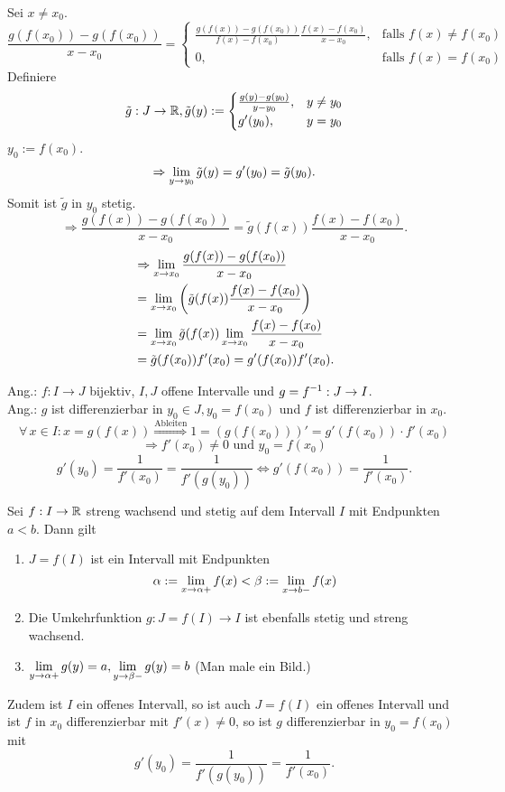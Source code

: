 \documentclass[../ana1.tex]{subfiles}
\begin{document}
\begin{bew}
    Sei \( x \neq x_0 \).
    \[ \frac{ g(f(x_0)) - g(f(x_0)) }{ x - x_0 } = \begin{cases}
        \frac{ g(f(x)) - g(f(x_0)) }{f(x) - f(x_0)} 
        \frac{ f(x) - f(x_0) }{ x-x_0 }, &\text{falls } f(x) \neq f(x_0)\\
        0, &\text{falls } f(x) = f(x_0)
    \end{cases} \]
    Definiere \[ \tilde{g} : J \rightarrow \mathbb{R}, \tilde{g}(y) := \begin{cases}
        \frac{ g(y) - g(y_0) }{ y - y_0 }, &y \neq y_0\\
        g'(y_0), &y=y_0
    \end{cases} \]
    \( y_0 := f(x_0) \).
    \[ \Rightarrow \lim\limits_{y\rightarrow y_0} \tilde{g}(y) = g'(y_0) = \tilde{g}(y_0). \]
    Somit ist \( \tilde{g} \) in \(y_0\) stetig.
    \[ \Rightarrow \frac{ g(f(x)) - g(f(x_0)) }{ x - x_0 } 
    = \tilde{g}(f(x)) \frac{ f(x) - f(x_0) }{x - x_0}. \]
    \begin{align*}
        &\Rightarrow \lim\limits_{x\rightarrow x_0} \frac{ g(f(x)) - g(f(x_0)) }{ x - x_0 } \\
        &= \lim\limits_{x\rightarrow x_0} \left( \tilde{g}(f(x)) \frac{f(x) - f(x_0)}{x - x_0} \right) \\
        &= \lim\limits_{x\rightarrow x_0} \tilde{g}(f(x)) \lim\limits_{x\rightarrow x_0} \frac{f(x) - f(x_0)}{x - x_0} \\
        &= \tilde{g}(f(x_0))f'(x_0) = g'(f(x_0)) f'(x_0).
    \end{align*}
\end{bew}
Ang.: \( f : I \rightarrow J\) bijektiv, \( I, J \) offene Intervalle und 
\( g = \inverse{f} : J \rightarrow I \).\\
Ang.: \( g \) ist differenzierbar in \( y_0 \in J, y_0 = f(x_0) \) und 
\( f \) ist differenzierbar in \(x_0\).
\[\forall \, x\in I: x = g(f(x)) \overset{\text{Ableiten}}{\Rightarrow} 1 = (g(f(x_0)))' 
= g'(f(x_0)) \cdot f'(x_0) \]
\[ \Rightarrow f'(x_0) \neq 0 \text{ und } y_0 = f(x_0) \]
\[ g'(y_0) = \frac{1}{f'(x_0)} = \frac{1}{f'(g(y_0))} 
\Leftrightarrow g'(f(x_0)) = \frac{1}{f'(x_0)}. \]
\begin{satz}\label{satz:diffbar_umkehr}
    Sei \( f: I \rightarrow \mathbb{R} \) streng wachsend und stetig auf 
    dem Intervall \(I\) mit Endpunkten \( a < b \). Dann gilt 
    \begin{enumerate}
        \item \( J = f(I) \) ist ein Intervall mit Endpunkten 
        \[ \alpha := \lim\limits_{x\rightarrow \alpha +} f(x) 
        < \beta := \lim\limits_{x\rightarrow b -} f(x) \]
        \item Die Umkehrfunktion \( g: J = f(I) \rightarrow I \) ist 
        ebenfalls stetig und streng wachsend.
        \item \( \lim\limits_{y\rightarrow \alpha +} g(y) = a, 
        \lim\limits_{y\rightarrow \beta -} g(y) = b \) (Man male ein Bild.)
    \end{enumerate}
    Zudem ist \( I \) ein offenes Intervall, so ist auch \( J = f(I) \) 
    ein offenes Intervall und ist \(f\) in \(x_0\) differenzierbar mit 
    \( f'(x) \neq 0 \), so ist \(g\) differenzierbar in \( y_0 = f(x_0) \) 
    mit 
    \[ g'(y_0) = \frac{1}{f'(g(y_0))} = \frac{1}{f'(x_0)}. \]
\end{satz}
\end{document}
